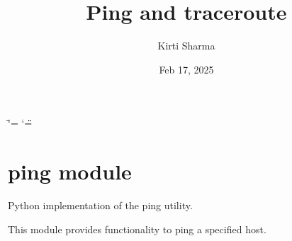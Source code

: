 \documentclass[letterpaper,10pt,english]{sphinxmanual}
\title{Ping and traceroute}
\date{Feb 17, 2025}
\author{Kirti Sharma}
\begin{document}
\ifdefined\shorthandoff
  \ifnum\catcode`\=\string=\active\shorthandoff{=}\fi
  \ifnum\catcode`\"=\active{}\fi
\fi

\pagestyle{empty}
\sphinxmaketitle
\pagestyle{plain}
\sphinxtableofcontents
\pagestyle{normal}
\label{\detokenize{index::doc}}


\sphinxstepscope


\chapter{ping module}
\label{\detokenize{ping:module-ping}}\label{\detokenize{ping:ping-module}}\label{\detokenize{ping::doc}}
\sphinxAtStartPar
Python implementation of the ping utility.

\sphinxAtStartPar
This module provides functionality to ping a specified host.
\end{document}
